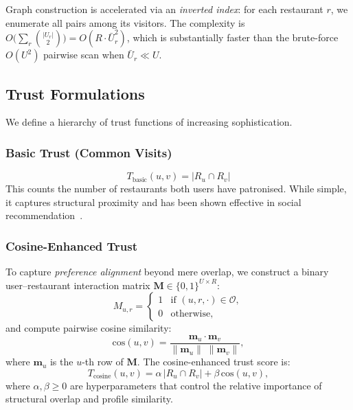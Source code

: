\documentclass[conference]{IEEEtran}
\begin{document}
Graph construction is accelerated via an \emph{inverted index}: for each
restaurant $r$, we enumerate all pairs among its visitors.  The
complexity is $O\!\bigl(\sum_{r} \binom{|U_r|}{2}\bigr) = O(R \cdot
\bar{U}_r^2)$, which is substantially faster than the brute-force
$O(U^2)$ pairwise scan when $\bar{U}_r \ll U$.

\subsection{Trust Formulations}
We define a hierarchy of trust functions of increasing sophistication.

\subsubsection{Basic Trust (Common Visits)}
\begin{equation}
  T_{\text{basic}}(u, v) = |R_u \cap R_v|
  \label{eq:trust_basic}
\end{equation}
This counts the number of restaurants both users have patronised.  While
simple, it captures structural proximity and has been shown effective in
social recommendation~\cite{massa2007trust}.

\subsubsection{Cosine-Enhanced Trust}
To capture \emph{preference alignment} beyond mere overlap, we construct
a binary user--restaurant interaction matrix $\mathbf{M} \in
\{0,1\}^{U \times R}$:
\begin{equation}
  M_{u,r} =
    \begin{cases}
      1 & \text{if } (u, r, \cdot) \in \mathcal{O}, \\
      0 & \text{otherwise},
    \end{cases}
  \label{eq:interaction_binary}
\end{equation}
and compute pairwise cosine similarity:
\begin{equation}
  \text{cos}(u, v) =
    \frac{\mathbf{m}_u \cdot \mathbf{m}_v}
         {\|\mathbf{m}_u\| \; \|\mathbf{m}_v\|},
  \label{eq:cosine}
\end{equation}
where $\mathbf{m}_u$ is the $u$-th row of $\mathbf{M}$.  The
cosine-enhanced trust score is:
\begin{equation}
  T_{\text{cosine}}(u, v) = \alpha \, |R_u \cap R_v| + \beta \,
    \text{cos}(u, v),
  \label{eq:trust_cosine}
\end{equation}
where $\alpha, \beta \geq 0$ are hyperparameters that control the
relative importance of structural overlap and profile similarity.
\end{document}

